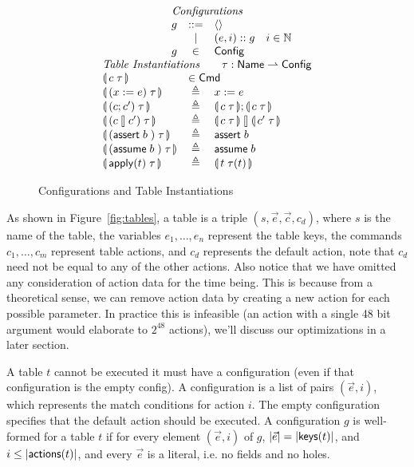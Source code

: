 \begin{figure}[ht]
  \[\begin{array}{l c l}
      \multicolumn{3}{c}{\textit{Configurations}} \\
      \multicolumn 1 r g & ::= & \langle\rangle \\
        & \mid & (e,i)::g \quad i \in \mathbb N \\
      \multicolumn 1 r g & \in & \mathsf{Config}\\
      \multicolumn 3 l {\textit{Table Instantiations} \qquad \tau : \Name \rightharpoonup \mathsf{Config}}\\
      \parenbb{c\; \tau} &\multicolumn 2 l {\in \mathsf{Cmd}} \\
      \parenbb{(x:= e)\; \tau} &\triangleq& x := e \\
      \parenbb{(c;c')\; \tau} &\triangleq& \parenbb{c\; \tau};\parenbb{c\; \tau} \\
      \parenbb{(c\angel c')\; \tau} &\triangleq& \parenbb{c\; \tau} \angel \parenbb{c'\; \tau}\\
      \parenbb{(\assert b)\; \tau} &\triangleq& \assert b \\
      \parenbb{(\assume b)\; \tau} &\triangleq& \assume b \\
      \parenbb{\apply t\; \tau} &\triangleq& \parenbb{t\; \tau(t)}
    \end{array}\]

  \caption{Configurations and Table Instantiations}
  \label{fig:configs}

  
  
\end{figure}



As shown in Figure~\ref{fig:tables}, a table is a triple
$(s, \vec e, \vec c, c_d)$, where $s$ is the name of the table, the variables
$e_1,\ldots,e_n$ represent the table keys, the commands $c_1,\ldots, c_m$
represent table actions, and $c_d$ represents the default action, note that
$c_d$ need not be equal to any of the other actions. Also notice that we have
omitted any consideration of action data for the time being. This is because
from a theoretical sense, we can remove action data by creating a new action for
each possible parameter. In practice this is infeasible (an action with a single
48 bit argument would elaborate to $2^{48}$ actions), we'll discuss our
optimizations in a later section.

A table $t$ cannot be executed it must have a configuration (even if that
configuration is the empty config). A configuration is a list of pairs
$(\vec e,i)$, which represents the match conditions for action $i$. The empty
configuration specifies that the default action should be executed. A
configuration $g$ is well-formed for a table $t$ if for every element
$(\vec e, i)$ of $g$, $|\vec e| = |\mathsf{keys}(t)|$, and $i \leq |\mathsf{actions}(t)|$, and
every $\vec e$ is a literal, i.e. no fields and no holes.

